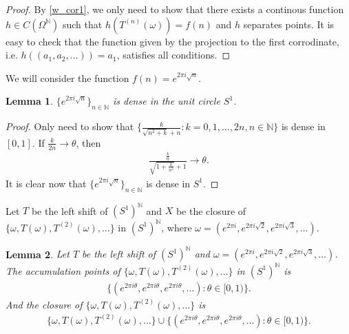 \documentclass[a4paper,10pt]{amsart}
\newtheorem{lemma}{Lemma}[section]
\newcommand{\N}{\mathbb N} %
\begin{document}
\begin{proof}
    By \cref{w_cor1}, we only need to show that there exists a continous
    function $h \in C(\Omega^{\N})$ such that 
    $h(T^{(n)}(\omega)) = f(n)$ and $h$ separates points.
    It is easy to check that the function given by the projection to the
    first corrodinate, i.e. $h((a_1,a_2,\ldots)) = a_1$, 
    satisfies all conditions.
\end{proof}

We will consider the function $f(n) = e^{2\pi i \sqrt{n}}$.

\begin{lemma}
    $\{ e^{2\pi i \sqrt{n}} \}_{n \in \N}$ is dense in the unit circle
    $S^{1}$.
\end{lemma}

\begin{proof}
    Only need to show that $\{\frac{k}{\sqrt{n^2 + k} + n} : k = 0, 1,
    \ldots, 2n, n \in \N \}$ is dense in $[0,1]$. If $\frac{k}{2n} \to
    \theta$, then
    \begin{align*}
        \frac{\frac{k}{n}}{\sqrt{1 + \frac{k}{n^2}} + 1} \to \theta. 
    \end{align*}
    It is clear now that $\{ e^{2\pi i \sqrt{n}} \}_{n \in \N}$ is dense
    in $S^{1}$.
\end{proof}

Let $T$ be the left shift of $(S^{1})^{\N}$ and $X$ be the closure of
$\{\omega, T(\omega), T^{(2)}(\omega), \ldots \}$ in $(S^{1})^{\N}$, where 
$\omega = (e^{2\pi i}, e^{2\pi i \sqrt{2}}, e^{2\pi i \sqrt{3}},
\ldots )$. 

\begin{lemma}
Let $T$ be the left shift of $(S^{1})^{\N}$ and
$\omega = (e^{2\pi i}, e^{2\pi i \sqrt{2}}, e^{2\pi i \sqrt{3}},\ldots )$.
The accumulation points of 
$\{\omega, T(\omega), T^{(2)}(\omega), \ldots \}$ 
in $(S^{1})^{\N}$ is
\begin{align*}
    \{(e^{2\pi i \theta}, e^{2\pi i \theta}, e^{2\pi i \theta}, \ldots ):
        \theta \in [0, 1) \}.
\end{align*}
And the closure of $\{\omega, T(\omega), T^{(2)}(\omega), \ldots \}$ is 
\begin{align*}
    \{\omega, T(\omega), T^{(2)}(\omega), \ldots \} \cup
    \{(e^{2\pi i \theta}, e^{2\pi i \theta}, e^{2\pi i \theta}, \ldots ):
        \theta \in [0, 1) \}.
\end{align*}
\end{lemma}
\end{document}
